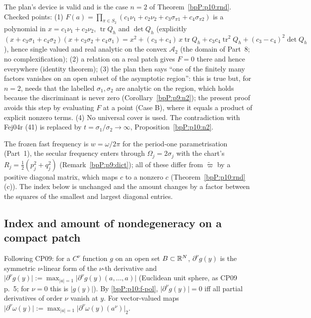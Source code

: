\begin{remark}[The symmetric-product argument for $n=2$, as recorded in PLAN.md]\label{bpP:p10:n2-check}
The plan's device is valid and is the case $n=2$ of Theorem~\ref{bpP:p10:rnd}. Checked points: (1) $F(a)=\prod_{\pi\in S_2}(c_1\nu_1+c_2\nu_2+c_3\sigma_{\pi1}+c_4\sigma_{\pi2})$ is a polynomial in $x=c_1\nu_1+c_2\nu_2$, $\operatorname{tr}Q_h$ and $\det Q_h$ (explicitly $(x+c_3\sigma_1+c_4\sigma_2)(x+c_3\sigma_2+c_4\sigma_1)=x^2+(c_3+c_4)\,x\operatorname{tr}Q_h+c_3c_4\operatorname{tr}^2Q_h+(c_3-c_4)^2\det Q_h$), hence single valued and real analytic on the convex $\mathcal A_2$ (the domain of Part~8; no complexification); (2) a relation on a real patch gives $F=0$ there and hence everywhere (identity theorem); (3) the plan then says ``one of the finitely many factors vanishes on an open subset of the asymptotic region'': this is true but, for $n=2$, needs that the labelled $\sigma_1,\sigma_2$ are analytic on the region, which holds because the discriminant is never zero (Corollary~\ref{bpP:p9:n2}); the present proof avoids this step by evaluating $F$ at a point (Case B), where it equals a product of explicit nonzero terms. (4) No universal cover is used. The contradiction with Fej04r (41) is replaced by $t=\sigma_1/\sigma_2\to\infty$, Proposition~\ref{bpP:p10:n2}.
\end{remark}

\begin{remark}[Scalings]\label{bpP:p10:scaling}
The frozen fast frequency is $w=\omega/2\pi$ for the period-one parametrisation (Part~1), the secular frequency enters through $\Omega_j=2\sigma_j$ with the chart's $R_j=\tfrac12(p_j^2+q_j^2)$ (Remark~\ref{bpP:p9:dict}); all of these differ from $\tilde\varpi$ by a positive diagonal matrix, which maps $c$ to a nonzero $c$ (Theorem~\ref{bpP:p10:rnd}(c)). The index below is unchanged and the amount changes by a factor between the squares of the smallest and largest diagonal entries.
\end{remark}

\subsection{Index and amount of nondegeneracy on a compact patch}\label{bpP:p10:sec-index}

Following CP09: for a $C^\nu$ function $g$ on an open set $B\subset\mathbb{R}^N$, $\partial^\nu g(y)$ is the symmetric $\nu$-linear form of the $\nu$-th derivative and $\lvert\partial^\nu g(y)\rvert:=\max_{\lvert a\rvert=1}\lvert\partial^\nu g(y)(a,\dots,a)\rvert$ (Euclidean unit sphere, as CP09 p.~5; for $\nu=0$ this is $\lvert g(y)\rvert$). By \ref{bpP:p10:f-pol}, $\lvert\partial^\nu g(y)\rvert=0$ iff all partial derivatives of order $\nu$ vanish at $y$. For vector-valued maps $\lvert\partial^\nu\omega(y)\rvert:=\max_{\lvert a\rvert=1}\lvert\partial^\nu\omega(y)(a^\nu)\rvert_2$.

